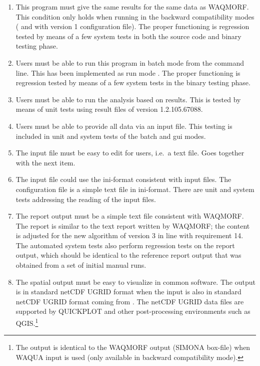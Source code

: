 \begin{enumerate}
\item This program must give the same results for the same data as WAQMORF.
This condition only holds when running in the backward compatibility modes ( and  with version 1 configuration file).
The proper functioning is regression tested by means of a few system tests in both the source code and binary testing phase.

\item Users must be able to run this program in batch mode from the command line.
This has been implemented as run mode .
The proper functioning is regression tested by means of a few system tests in the binary testing phase.

\item Users must be able to run the analysis based on \dflowfm results.
This is tested by means of unit tests using result files of \dflowfm version 1.2.105.67088.

\item Users must be able to provide all data via an input file.
This testing is included in unit and system tests of the batch and gui modes.

\item The input file must be easy to edit for users, i.e.~a text file.
Goes together with the next item.

\item The input file could use the ini-format consistent with \dflowfm input files.
The \dfastmi configuration file is a simple text file in ini-format.
There are unit and system tests addressing the reading of the input files.

\item The report output must be a simple text file consistent with WAQMORF.
The report is similar to the text report written by WAQMORF; the content is adjusted for the new algorithm of \dfastmi version 3 in line with requirement 14.
The automated system tests also perform regression tests on the report output, which should be identical to the reference report output that was obtained from a set of initial manual runs.

\item The spatial output must be easy to visualize in common software.
The output is in standard netCDF UGRID format when the input is also in standard netCDF UGRID format coming from \dflowfm.
The netCDF UGRID data files are supported by QUICKPLOT and other post-processing environments such as QGIS.\footnote{The output is identical to the WAQMORF output (SIMONA box-file) when WAQUA input is used (only available in backward compatibility mode).}


\end{enumerate}
